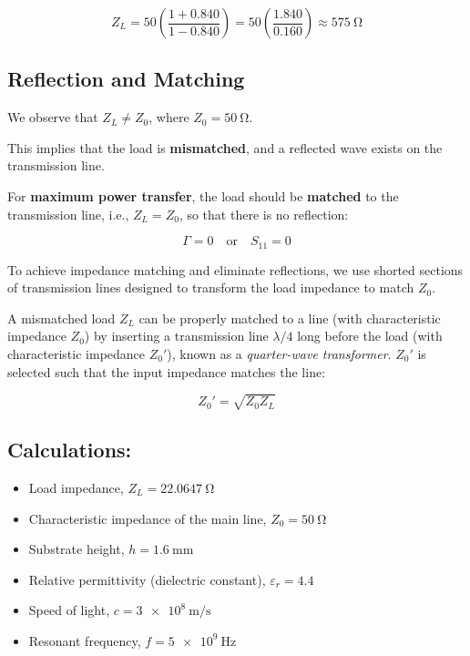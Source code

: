 \documentclass[conference]{IEEEtran}
\begin{document}
\begin{equation}
Z_L = 50 \left( \frac{1 + 0.840}{1 - 0.840} \right) = 50 \left( \frac{1.840}{0.160} \right) \approx \SI{575}{\ohm}
\end{equation}

\subsection*{Reflection and Matching}

We observe that $Z_L \ne Z_0$, where $Z_0 = \SI{50}{\ohm}$. 

This implies that the load is \textbf{mismatched}, and a reflected wave exists on the transmission line. 

For \textbf{maximum power transfer}, the load should be \textbf{matched} to the transmission line, i.e., $Z_L = Z_0$, so that there is no reflection:

\[
\Gamma = 0 \quad \text{or} \quad S_{11} = 0
\]

To achieve impedance matching and eliminate reflections, we use shorted sections of transmission lines designed to transform the load impedance to match $Z_0$.

A mismatched load $Z_L$ can be properly matched to a line (with characteristic impedance $Z_0$) by inserting a transmission line $\lambda/4$ long before the load (with characteristic impedance $Z_0'$), known as a \textit{quarter-wave transformer}. $Z_0'$ is selected such that the input impedance matches the line:

\begin{equation}
Z_0' = \sqrt{Z_0 Z_L}
\end{equation}

\subsection*{Calculations:}

\begin{itemize}
    \item Load impedance, \( Z_L = \SI{22.0647}{\ohm} \)
    \item Characteristic impedance of the main line, \( Z_0 = \SI{50}{\ohm} \)
    \item Substrate height, \( h = \SI{1.6}{\milli\meter} \)
    \item Relative permittivity (dielectric constant), \( \varepsilon_r = 4.4 \)
    \item Speed of light, \( c = \SI{3e8}{\meter\per\second} \)
    \item Resonant frequency, \( f = \SI{5e9}{\hertz} \)
\end{itemize}
\end{document}
